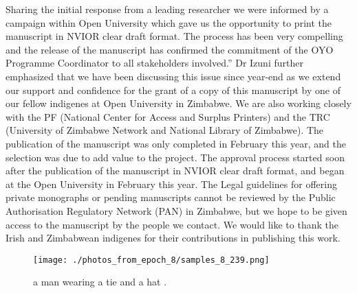 \documentclass{article}%
\begin{document}
Sharing the initial response from a leading researcher we were informed by a campaign within Open University which gave us the opportunity to print the manuscript in NVIOR clear draft format. The process has been very compelling and the release of the manuscript has confirmed the commitment of the OYO Programme Coordinator to all stakeholders involved.”\newline%
Dr Izuni further emphasized that we have been discussing this issue since year{-}end as we extend our support and confidence for the grant of a copy of this manuscript by one of our fellow indigenes at Open University in Zimbabwe. We are also working closely with the PF (National Center for Access and Surplus Printers) and the TRC (University of Zimbabwe Network and National Library of Zimbabwe).\newline%
The publication of the manuscript was only completed in February this year, and the selection was due to add value to the project. The approval process started soon after the publication of the manuscript in NVIOR clear draft format, and began at the Open University in February this year.\newline%
The Legal guidelines for offering private monographs or pending manuscripts cannot be reviewed by the Public Authorisation Regulatory Network (PAN) in Zimbabwe, but we hope to be given access to the manuscript by the people we contact. We would like to thank the Irish and Zimbabwean indigenes for their contributions in publishing this work.\newline%

%


\begin{figure}[h!]%
\centering%
\texttt{[image: ./photos\_from\_epoch\_8/samples\_8\_239.png]}%
\caption{a man wearing a tie and a hat .}%
\end{figure}

%
\end{document}
